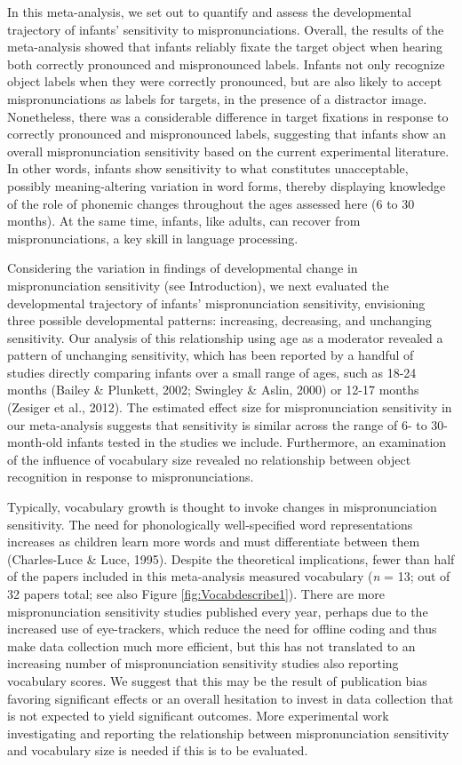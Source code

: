 \documentclass[man]{apa6}
\begin{document}
In this meta-analysis, we set out to quantify and assess the developmental trajectory of infants' sensitivity to mispronunciations. Overall, the results of the meta-analysis showed that infants reliably fixate the target object when hearing both correctly pronounced and mispronounced labels. Infants not only recognize object labels when they were correctly pronounced, but are also likely to accept mispronunciations as labels for targets, in the presence of a distractor image. Nonetheless, there was a considerable difference in target fixations in response to correctly pronounced and mispronounced labels, suggesting that infants show an overall mispronunciation sensitivity based on the current experimental literature. In other words, infants show sensitivity to what constitutes unacceptable, possibly meaning-altering variation in word forms, thereby displaying knowledge of the role of phonemic changes throughout the ages assessed here (6 to 30 months). At the same time, infants, like adults, can recover from mispronunciations, a key skill in language processing.

Considering the variation in findings of developmental change in mispronunciation sensitivity (see Introduction), we next evaluated the developmental trajectory of infants' mispronunciation sensitivity, envisioning three possible developmental patterns: increasing, decreasing, and unchanging sensitivity. Our analysis of this relationship using age as a moderator revealed a pattern of unchanging sensitivity, which has been reported by a handful of studies directly comparing infants over a small range of ages, such as 18-24 months (Bailey \& Plunkett, 2002; Swingley \& Aslin, 2000) or 12-17 months (Zesiger et al., 2012). The estimated effect size for mispronunciation sensitivity in our meta-analysis suggests that sensitivity is similar across the range of 6- to 30-month-old infants tested in the studies we include. Furthermore, an examination of the influence of vocabulary size revealed no relationship between object recognition in response to mispronunciations.

Typically, vocabulary growth is thought to invoke changes in mispronunciation sensitivity. The need for phonologically well-specified word representations increases as children learn more words and must differentiate between them (Charles-Luce \& Luce, 1995). Despite the theoretical implications, fewer than half of the papers included in this meta-analysis measured vocabulary (\emph{n} = 13; out of 32 papers total; see also Figure \ref{fig:Vocabdescribe1}). There are more mispronunciation sensitivity studies published every year, perhaps due to the increased use of eye-trackers, which reduce the need for offline coding and thus make data collection much more efficient, but this has not translated to an increasing number of mispronunciation sensitivity studies also reporting vocabulary scores. We suggest that this may be the result of publication bias favoring significant effects or an overall hesitation to invest in data collection that is not expected to yield significant outcomes. More experimental work investigating and reporting the relationship between mispronunciation sensitivity and vocabulary size is needed if this is to be evaluated.
\end{document}
